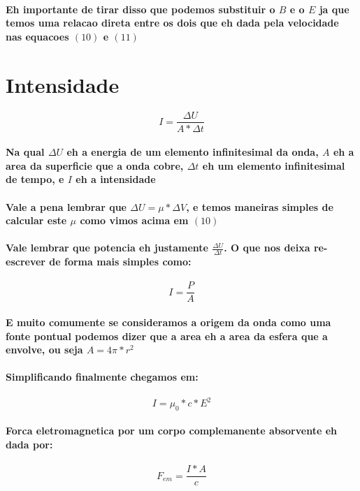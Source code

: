 \documentclass[12pt,twoside, a4paper, twocolumn]{article}
\begin{document}
\paragraph{Eh importante de tirar disso que podemos substituir o $B$ e o $E$ ja que temos uma relacao direta entre os dois que eh dada pela velocidade nas equacoes $(10)$ e $(11)$}

\section*{Intensidade}
\begin{equation}
    I = \frac{\Delta{U}}{A * \Delta{t}}
\end{equation}
\paragraph*{Na qual $\Delta{U}$ eh a energia de um elemento infinitesimal da onda, $A$ eh a area da superficie que a onda cobre, $\Delta{t}$ eh um elemento infinitesimal de tempo, e $I$ eh a intensidade}
\paragraph*{Vale a pena lembrar que $\Delta{U} = \mu * \Delta{V}$, e temos maneiras simples de calcular este $\mu$ como vimos acima em $(10)$}
\paragraph*{Vale lembrar que potencia eh justamente $\frac{\Delta{U}}{\Delta{t}}$. O que nos deixa re-escrever de forma mais simples como:}
\begin{equation}
    I = \frac{P}{A}
\end{equation}
\paragraph*{E muito comumente se consideramos a origem da onda como uma fonte pontual podemos dizer que a area eh a area da esfera que a envolve, ou seja $A = 4\pi * r^2$}
\paragraph*{Simplificando finalmente chegamos em:}
\begin{equation}
    I = \mu_0 * c * E^2
\end{equation}
\paragraph*{Forca eletromagnetica por um corpo complemanente absorvente eh dada por:}
\begin{equation}
    F_{em} = \frac{I * A}{c}
\end{equation}
\end{document}
